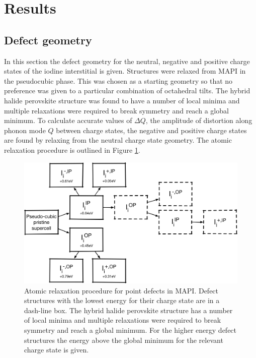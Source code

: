 \section{Results} \label{ch:6-results}

\subsection{Defect geometry}

In this section the defect geometry for the neutral, negative and positive charge states of the iodine interstitial is given. Structures were relaxed from MAPI in the pseudocubic phase. This was chosen as a starting geometry so that no preference was given to a particular combination of octahedral tilts. The hybrid halide perovskite structure was found to have a number of local minima and multiple relaxations were required to break symmetry and reach a global minimum. To calculate accurate values of $\Delta Q$, the amplitude of distortion along phonon mode $Q$ between charge states, the negative and positive charge states are found by relaxing from the neutral charge state geometry. The atomic relaxation procedure is outlined in Figure \ref{relaxation_workflow}.

\begin{figure}[h!]
\centering
  \includegraphics[width=0.7\columnwidth]{figures/ch6/relaxation_workflow.png}
  \caption[Atomic relaxation procedure for point defects in MAPI]{Atomic relaxation procedure for point defects in MAPI. Defect structures with the lowest energy for their charge state are in a dash-line box. The hybrid halide perovskite structure has a number of local minima and multiple relaxations were required to break symmetry and reach a global minimum. For the higher energy defect structures the energy above the global minimum for the relevant charge state is given.}
\label{relaxation_workflow}
\end{figure}


